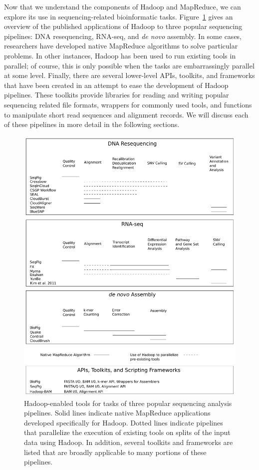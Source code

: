Now that we understand the components of Hadoop and MapReduce, we can explore its use in sequencing-related bioinformatic tasks. Figure~\ref{bio_hadoop_ecosystem} gives an overview of the published applications of Hadoop to three popular sequencing pipelines: DNA resequencing, RNA-seq, and \emph{de novo} assembly. In some cases, researchers have developed native MapReduce algorithms to solve particular problems. In other instances, Hadoop has been used to run existing tools in parallel; of course, this is only possible when the tasks are embarrassingly parallel at some level. Finally, there are several lower-level APIs, toolkits, and frameworks that have been created in an attempt to ease the development of Hadoop pipelines. These toolkits provide libraries for reading and writing popular sequencing related file formats, wrappers for commonly used tools, and functions to manipulate short read sequences and alignment records. We will discuss each of these pipelines in more detail in the following sections.

\begin{figure}
\centering
\includegraphics[width=1\textwidth]{figures/bio_hadoop_ecosystem.pdf}
\caption[Hadoop-enabled tools for tasks of three popular sequencing analysis pipelines.]{Hadoop-enabled tools for tasks of three popular sequencing analysis pipelines. Solid lines indicate native MapReduce applications developed specifically for Hadoop. Dotted lines indicate pipelines that parallelize the execution of existing tools on splits of the input data using Hadoop. In addition, several toolkits and frameworks are listed that are broadly applicable to many portions of these pipelines.}
\label{bio_hadoop_ecosystem}
\end{figure}

